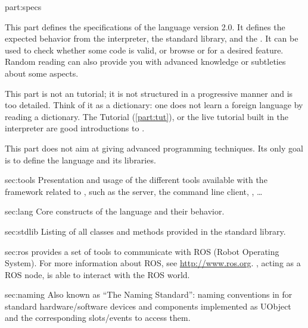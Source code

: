 
\begin{partDescription}{part:specs}
  {
    This part defines the specifications of the \us language version
    2.0. It defines the expected behavior from the \us interpreter,
    the standard library, and the \sdk. It can be used to check
    whether some code is valid, or browse \us or \Cxx \api for a
    desired feature. Random reading can also provide you with advanced
    knowledge or subtleties about some \us aspects.

    This part is not an \us tutorial; it is not structured in a
    progressive manner and is too detailed.  Think of it as a
    dictionary: one does not learn a foreign language by reading a
    dictionary. The \us Tutorial (\autoref{part:tut}), or the live \us
    tutorial built in the interpreter are good introductions to \us.

    This part does not aim at giving advanced programming
    techniques. Its only goal is to define the language and its
    libraries.
  }
\item[sec:tools]
  Presentation and usage of the different tools available with the
  \urbi framework related to \us, such as the \urbi server, the
  command line client, \umake, \ldots

\item[sec:lang]
  Core constructs of the language and their behavior.

\item[sec:stdlib]
  Listing of all classes and methods provided in the standard library.

\item[sec:ros] \urbi provides a set of tools to communicate with ROS (Robot
  Operating System). For more information about ROS, see
  \url{http://www.ros.org}.  \urbi, acting as a ROS node, is able to
  interact with the ROS world.

\item[sec:naming]
  Also known as ``The \urbi Naming Standard'': naming conventions in
  for standard hardware/software devices and components implemented as
  UObject and the corresponding slots/events to access them.

\end{partDescription}


